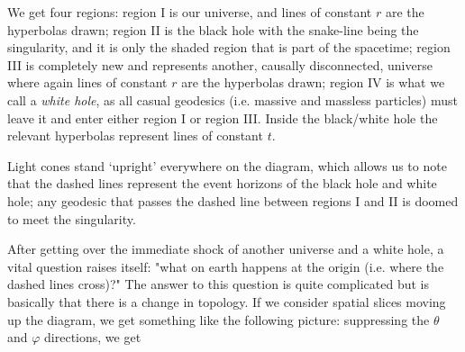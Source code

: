 We get four regions: region I is our universe, and lines of constant $r$ are the hyperbolas drawn; region II is the black hole with the snake-line being the singularity, and it is only the shaded region that is part of the spacetime; region III is completely new and represents another, causally disconnected, universe where again lines of constant $r$ are the hyperbolas drawn; region IV is what we call a \textit{white hole}, as all casual geodesics (i.e. massive and massless particles) must leave it and enter either region I or region III. Inside the black/white hole the relevant hyperbolas represent lines of constant $t$.

Light cones stand `upright' everywhere on the diagram, which allows us to note that the dashed lines represent the event horizons of the black hole and white hole; any geodesic that passes the dashed line between regions I and II is doomed to meet the singularity. 

After getting over the immediate shock of another universe and a white hole, a vital question raises itself: "what on earth happens at the origin (i.e. where the dashed lines cross)?" The answer to this question is quite complicated but is basically that there is a change in topology. If we consider spatial slices moving up the diagram, we get something like the following picture: suppressing the $\theta$ and $\varphi$ directions, we get 

